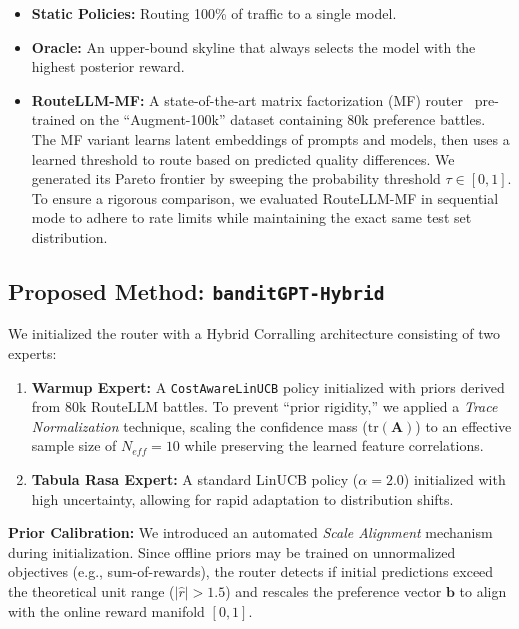 \begin{itemize}
    \item \textbf{Static Policies:} Routing 100\% of traffic to a single model.
    \item \textbf{Oracle:} An upper-bound skyline that always selects the model with the highest posterior reward.
    \item \textbf{RouteLLM-MF:} A state-of-the-art matrix factorization (MF) router~\cite{routellm2024} pre-trained on the ``Augment-100k'' dataset containing 80k preference battles. The MF variant learns latent embeddings of prompts and models, then uses a learned threshold to route based on predicted quality differences. We generated its Pareto frontier by sweeping the probability threshold $\tau \in [0, 1]$. To ensure a rigorous comparison, we evaluated RouteLLM-MF in sequential mode to adhere to rate limits while maintaining the exact same test set distribution.
\end{itemize}

\subsection{Proposed Method: \texttt{banditGPT-Hybrid}}

We initialized the router with a Hybrid Corralling architecture consisting of two experts:

\begin{enumerate}
    \item \textbf{Warmup Expert:} A \texttt{CostAwareLinUCB} policy initialized with priors derived from 80k RouteLLM battles. To prevent ``prior rigidity,'' we applied a \textit{Trace Normalization} technique, scaling the confidence mass ($\text{tr}(\mathbf{A})$) to an effective sample size of $N_{eff}=10$ while preserving the learned feature correlations.
    
    \item \textbf{Tabula Rasa Expert:} A standard LinUCB policy ($\alpha=2.0$) initialized with high uncertainty, allowing for rapid adaptation to distribution shifts.
\end{enumerate}

\textbf{Prior Calibration:} We introduced an automated \textit{Scale Alignment} mechanism during initialization. Since offline priors may be trained on unnormalized objectives (e.g., sum-of-rewards), the router detects if initial predictions exceed the theoretical unit range ($|\hat{r}| > 1.5$) and rescales the preference vector $\mathbf{b}$ to align with the online reward manifold $[0, 1]$.

